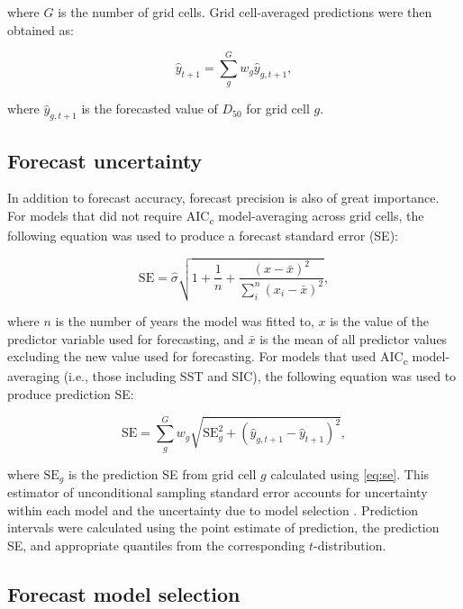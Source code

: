 \documentclass[12pt,]{book}
\theoremstyle{definition}
\theoremstyle{definition}
\theoremstyle{definition}
\theoremstyle{remark}
\begin{document}
\noindent
where \(G\) is the number of grid cells. Grid cell-averaged predictions
were then obtained as:

\begin{equation}
  \hat{y}_{t+1}=\sum_g^G w_g \hat{y}_{g,t+1},
\label{eq:grid-avg-fcst}
\end{equation}

\noindent
where \(\hat{y}_{g,t+1}\) is the forecasted value of \(D_{50}\) for grid
cell \(g\).

\subsection{Forecast uncertainty}\label{forecast-uncertainty}

\noindent
In addition to forecast accuracy, forecast precision is also of great
importance. For models that did not require AIC\textsubscript{c}
model-averaging across grid cells, the following equation was used to
produce a forecast standard error (SE):

\begin{equation}
  \text{SE}=\hat{\sigma} \sqrt{1 + \frac{1}{n} + \frac{(x-\bar{x})^2}{\sum_i^n(x_i-\bar{x})^2}},
\label{eq:se}
\end{equation}

\noindent
where \(n\) is the number of years the model was fitted to, \(x\) is the
value of the predictor variable used for forecasting, and \(\bar{x}\) is
the mean of all predictor values excluding the new value used for
forecasting. For models that used AIC\textsubscript{c} model-averaging
(i.e., those including SST and SIC), the following equation was used to
produce prediction SE:

\begin{equation}
  \text{SE}=\sum_g^G w_g \sqrt{\text{SE}_g^2+(\hat{y}_{g,t+1}-\hat{y}_{t+1})^2},
\label{eq:mod-avg-se}
\end{equation}

\noindent
where \(\text{SE}_g\) is the prediction SE from grid cell \(g\)
calculated using \eqref{eq:se}. This estimator of unconditional sampling
standard error accounts for uncertainty within each model and the
uncertainty due to model selection \citep{burnham-anderson-2002}.
Prediction intervals were calculated using the point estimate of
prediction, the prediction SE, and appropriate quantiles from the
corresponding \(t\)-distribution.

\subsection{Forecast model selection}\label{model-selection}
\end{document}
